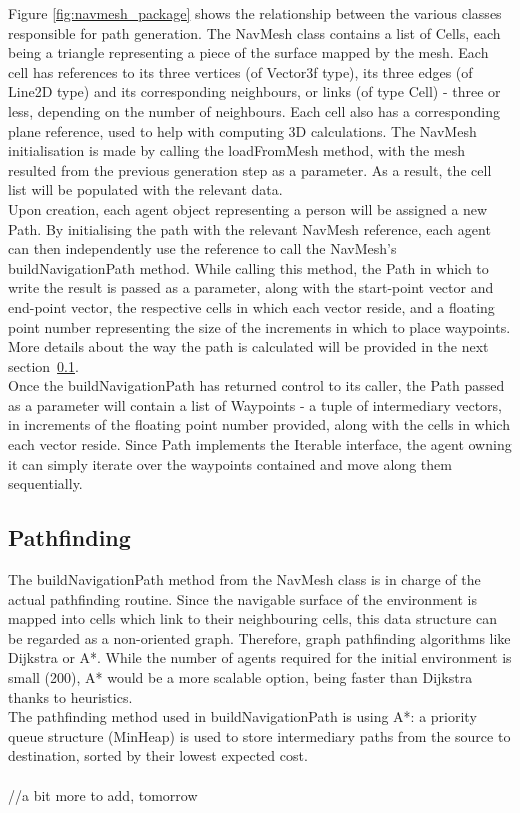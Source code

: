 Figure \ref{fig:navmesh_package} shows the relationship between the various classes responsible for path generation. The NavMesh class contains a list of Cells, each being a triangle representing a piece of the surface mapped by the mesh. Each cell has references to its three vertices (of Vector3f type), its three edges (of Line2D type) and its corresponding neighbours, or links (of type Cell) - three or less, depending on the number of neighbours. Each cell also has a corresponding plane reference, used to help with computing 3D calculations.
The NavMesh initialisation is made by calling the loadFromMesh method, with the mesh resulted from the previous generation step as a parameter. As a result, the cell list will be populated with the relevant data. \\
Upon creation, each agent object representing a person will be assigned a new Path. By initialising the path with the relevant NavMesh reference, each agent can then independently use the reference to call the NavMesh's buildNavigationPath method. While calling this method, the Path in which to write the result is passed as a parameter, along with the start-point vector and end-point vector, the respective cells in which each vector reside, and a floating point number representing the size of the increments in which to place waypoints. More details about the way the path is calculated will be provided in the next section~\ref{pathfinding}. \\
Once the buildNavigationPath has returned control to its caller, the Path passed as a parameter will contain a list of Waypoints - a tuple of intermediary vectors, in increments of the floating point number provided, along with the cells in which each vector reside. Since Path implements the Iterable interface, the agent owning it can simply iterate over the waypoints contained and move along them sequentially.

\subsection{Pathfinding}
\label{pathfinding}

The buildNavigationPath method from the NavMesh class is in charge of the actual pathfinding routine. Since the navigable surface of the environment is mapped into cells which link to their neighbouring cells, this data structure can be regarded as a non-oriented graph. Therefore, graph pathfinding algorithms like Dijkstra\cite{Dijkstra} or A*\cite{Astar}.
While the number of agents required for the initial environment is small (200), A* would be a more scalable option, being faster than Dijkstra thanks to heuristics.\\
The pathfinding method used in buildNavigationPath is using A*: a priority queue structure (MinHeap) is used to store intermediary paths from the source to destination, sorted by their lowest expected cost.\\\\
//a bit more to add, tomorrow

%
%
%
